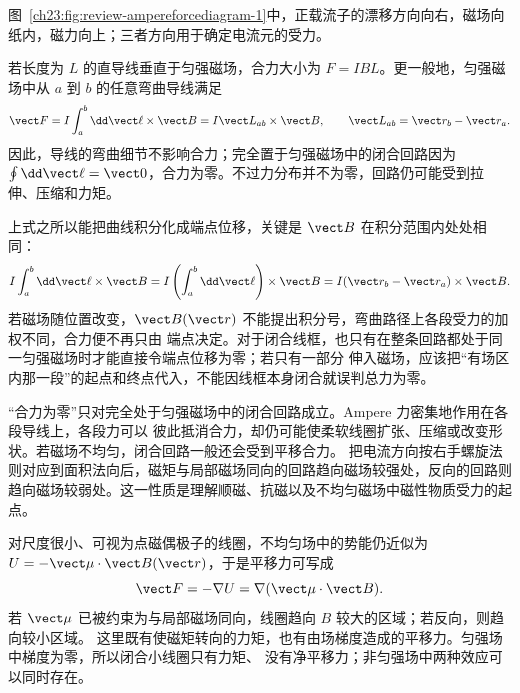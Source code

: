 图~\ref{ch23:fig:review-ampereforcediagram-1}中，正载流子的漂移方向向右，磁场向纸内，磁力向上；三者方向用于确定电流元的受力。
\par\noindent\begin{minipage}{\linewidth}
\ampereForceDiagram
{}\label{ch23:fig:review-ampereforcediagram-1}
\end{minipage}\par\medskip

若长度为 $L$ 的直导线垂直于匀强磁场，合力大小为 $F=IBL$。更一般地，匀强磁场中从 $a$ 到
$b$ 的任意弯曲导线满足
\begin{equation}
  \vect F=I\int_a^b\dd\vect\ell\times\vect B
  =I\vect L_{ab}\times\vect B,
  \qquad \vect L_{ab}=\vect r_b-\vect r_a.
\end{equation}
因此，导线的弯曲细节不影响合力；完全置于匀强磁场中的闭合回路因为
$\oint\dd\vect\ell=\vect 0$，合力为零。不过力分布并不为零，回路仍可能受到拉伸、压缩和力矩。

上式之所以能把曲线积分化成端点位移，关键是 $\vect B$ 在积分范围内处处相同：
\begin{equation}
 I\int_a^b\dd\vect\ell\times\vect B
 =I\left(\int_a^b\dd\vect\ell\right)\times\vect B
 =I(\vect r_b-\vect r_a)\times\vect B.
\end{equation}
若磁场随位置改变，$\vect B(\vect r)$ 不能提出积分号，弯曲路径上各段受力的加权不同，合力便不再只由
端点决定。对于闭合线框，也只有在整条回路都处于同一匀强磁场时才能直接令端点位移为零；若只有一部分
伸入磁场，应该把“有场区内那一段”的起点和终点代入，不能因线框本身闭合就误判总力为零。

“合力为零”只对完全处于匀强磁场中的闭合回路成立。Ampere 力密集地作用在各段导线上，各段力可以
彼此抵消合力，却仍可能使柔软线圈扩张、压缩或改变形状。若磁场不均匀，闭合回路一般还会受到平移合力。
把电流方向按右手螺旋法则对应到面积法向后，磁矩与局部磁场同向的回路趋向磁场较强处，反向的回路则
趋向磁场较弱处。这一性质是理解顺磁、抗磁以及不均匀磁场中磁性物质受力的起点。

对尺度很小、可视为点磁偶极子的线圈，不均匀场中的势能仍近似为
$U=-\vect\mu\cdot\vect B(\vect r)$，于是平移力可写成
\begin{equation}
  \vect F=-\nabla U=\nabla(\vect\mu\cdot\vect B).
\end{equation}
若 $\vect\mu$ 已被约束为与局部磁场同向，线圈趋向 $B$ 较大的区域；若反向，则趋向较小区域。
这里既有使磁矩转向的力矩，也有由场梯度造成的平移力。匀强场中梯度为零，所以闭合小线圈只有力矩、
没有净平移力；非匀强场中两种效应可以同时存在。

